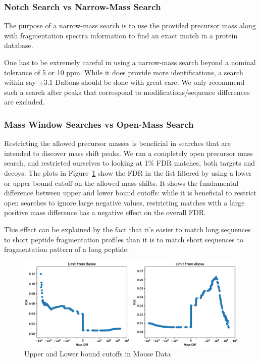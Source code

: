 \documentclass[journal=jprobs,manuscript=article]{achemso}
\begin{document}
\subsubsection{Notch Search vs Narrow-Mass Search}

The purpose of a narrow-mass search is to use the provided precursor mass along with fragmentation spectra information to find an exact match in a protein database.

One has to be extremely careful in using a narrow-mass search beyond a nominal tolerance of 5 or 10 ppm. 
While it does provide more identifications, a search within say $\pm 3.1$ Daltons should be done with great care.
We only recommend such a search after peaks that correspond to modifications/sequence differences are excluded.

\subsubsection{Mass Window Searches vs Open-Mass Search}

Restricting the allowed precursor masses is beneficial in searches that are intended to discover mass shift peaks.
We ran a completely open precursor mass search, and restricted ourselves to looking at 1\% FDR matches, both targets and decoys.
The plots in Figure~\ref{fig:figure2-upperlowerbounds} show the FDR in the list filtered by using a lower or upper bound cutoff on the allowed mass shifts.
It shows the fundamental difference between upper and lower bound cutoffs: while it is beneficial to restrict open searches to ignore large negative values, restricting matches with a large positive mass difference has a negative effect on the overall FDR.

This effect can be explained by the fact that it's easier to match long sequences to short peptide fragmentation profiles than it is to match short sequences to fragmentation pattern of a long peptide.

\begin{figure}
\caption{Upper and Lower bound cutoffs in Mouse Data}
\label{fig:figure2-upperlowerbounds}
\includegraphics[scale=0.5]{figure_2-upperlowerbounds}
\end{figure}
\end{document}
